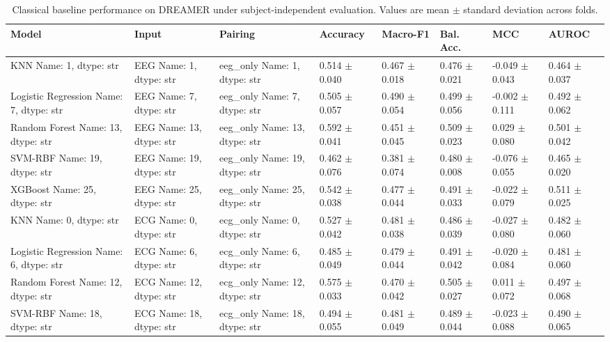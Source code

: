 \begin{table}[!t]
\centering
\caption{Classical baseline performance on DREAMER under subject-independent evaluation. Values are mean $\pm$ standard deviation across folds.}
\label{tab:dreamer_classical_results}
\begin{tabular}{llllllll}
\toprule
Model & Input & Pairing & Accuracy & Macro-F1 & Bal. Acc. & MCC & AUROC \\
\midrule
    KNN
Name: 1, dtype: str &     EEG
Name: 1, dtype: str &     eeg_only
Name: 1, dtype: str & 0.514 $\pm$ 0.040 & 0.467 $\pm$ 0.018 & 0.476 $\pm$ 0.021 & -0.049 $\pm$ 0.043 & 0.464 $\pm$ 0.037 \\
    Logistic Regression
Name: 7, dtype: str &     EEG
Name: 7, dtype: str &     eeg_only
Name: 7, dtype: str & 0.505 $\pm$ 0.057 & 0.490 $\pm$ 0.054 & 0.499 $\pm$ 0.056 & -0.002 $\pm$ 0.111 & 0.492 $\pm$ 0.062 \\
    Random Forest
Name: 13, dtype: str &     EEG
Name: 13, dtype: str &     eeg_only
Name: 13, dtype: str & 0.592 $\pm$ 0.041 & 0.451 $\pm$ 0.045 & 0.509 $\pm$ 0.023 & 0.029 $\pm$ 0.080 & 0.501 $\pm$ 0.042 \\
    SVM-RBF
Name: 19, dtype: str &     EEG
Name: 19, dtype: str &     eeg_only
Name: 19, dtype: str & 0.462 $\pm$ 0.076 & 0.381 $\pm$ 0.074 & 0.480 $\pm$ 0.008 & -0.076 $\pm$ 0.055 & 0.465 $\pm$ 0.020 \\
    XGBoost
Name: 25, dtype: str &     EEG
Name: 25, dtype: str &     eeg_only
Name: 25, dtype: str & 0.542 $\pm$ 0.038 & 0.477 $\pm$ 0.044 & 0.491 $\pm$ 0.033 & -0.022 $\pm$ 0.079 & 0.511 $\pm$ 0.025 \\
    KNN
Name: 0, dtype: str &     ECG
Name: 0, dtype: str &     ecg_only
Name: 0, dtype: str & 0.527 $\pm$ 0.042 & 0.481 $\pm$ 0.038 & 0.486 $\pm$ 0.039 & -0.027 $\pm$ 0.080 & 0.482 $\pm$ 0.060 \\
    Logistic Regression
Name: 6, dtype: str &     ECG
Name: 6, dtype: str &     ecg_only
Name: 6, dtype: str & 0.485 $\pm$ 0.049 & 0.479 $\pm$ 0.044 & 0.491 $\pm$ 0.042 & -0.020 $\pm$ 0.084 & 0.481 $\pm$ 0.060 \\
    Random Forest
Name: 12, dtype: str &     ECG
Name: 12, dtype: str &     ecg_only
Name: 12, dtype: str & 0.575 $\pm$ 0.033 & 0.470 $\pm$ 0.042 & 0.505 $\pm$ 0.027 & 0.011 $\pm$ 0.072 & 0.497 $\pm$ 0.068 \\
    SVM-RBF
Name: 18, dtype: str &     ECG
Name: 18, dtype: str &     ecg_only
Name: 18, dtype: str & 0.494 $\pm$ 0.055 & 0.481 $\pm$ 0.049 & 0.489 $\pm$ 0.044 & -0.023 $\pm$ 0.088 & 0.490 $\pm$ 0.065 \\

\end{tabular}
\end{table}
